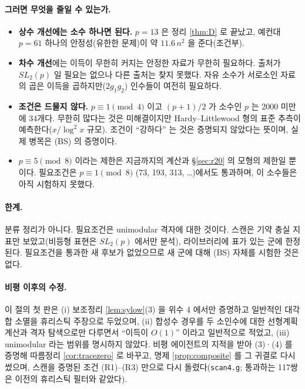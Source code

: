 \paragraph{그러면 무엇을 줄일 수 있는가.}
\begin{itemize}
\item \textbf{상수 개선에는 소수 하나면 된다.} $p=13$ 은 정리 \ref{thm:D} 로 끝났고, 예컨대 $p=61$ 하나의 안정성(유한한 문제)이 약 $11.6\,n^2$ 을 준다(조건부).
\item \textbf{차수 개선}에는 이득이 무한히 커지는 안정한 자료가 무한히 필요하다. 출처가 $SL_2(p)$ 일 필요는 없으나 다른 출처는 찾지 못했다. 자유 소수가 서로소인 자료의 곱은 이득을 곱하지만($2g_1g_2$) 인수들이 여전히 필요하다.
\item \textbf{조건은 드물지 않다.} $p\equiv1\pmod4$ 이고 $(p+1)/2$ 가 소수인 $p$ 는 2000 미만에 34개다. 무한히 많다는 것은 미해결이지만 Hardy--Littlewood 형의 표준 추측이 예측한다($x/\log^2x$ 규모). 조건이 ``강하다'' 는 것은 증명되지 않았다는 뜻이며, 실제 병목은 (BS) 의 증명이다.
\item $p\equiv5\pmod8$ 이라는 제한은 지금까지의 계산과 \S\ref{sec:r20} 의 모형의 제한일 뿐이다. 필요조건은 $p\equiv1\pmod8$ (73, 193, 313, \dots)에서도 통과하며, 이 소수들은 아직 시험하지 못했다.
\end{itemize}

\paragraph{한계.} 분류 정리가 아니다. 필요조건은 unimodular 격자에 대한 것이다. 스캔은 기약 충실 지표만 보았고(비등형 표현은 $SL_2(p)$ 에서만 분석), 라이브러리에 표가 있는 군에 한정된다. 필요조건을 통과한 새 후보가 없었으므로 새 군에 대해 (BS) 자체를 시험한 것은 없다.

\paragraph{비평 이후의 수정.} 이 절의 첫 판은 (i) 보조정리 \ref{lem:sylow}(3) 을 위수 4 에서만 증명하고 일반적인 대각합 소멸을 휴리스틱 주장으로 두었으며, (ii) 합성수 경우를 두 소인수에 대한 선형계획 계산과 격자 탐색으로만 다루면서 ``이득이 $O(1)$'' 이라고 일반적으로 적었고, (iii) unimodular 라는 범위를 명시하지 않았다. 비평 에이전트의 지적을 받아 (3)·(4) 를 증명해 따름정리 \ref{cor:tracezero} 로 바꾸고, 명제 \ref{prop:composite} 를 그 귀결로 다시 썼으며, 스캔을 증명된 조건 (R1)--(R3) 만으로 다시 돌렸다(\texttt{scan4.g}; 통과하는 117쌍은 이전의 휴리스틱 필터와 같았다).
